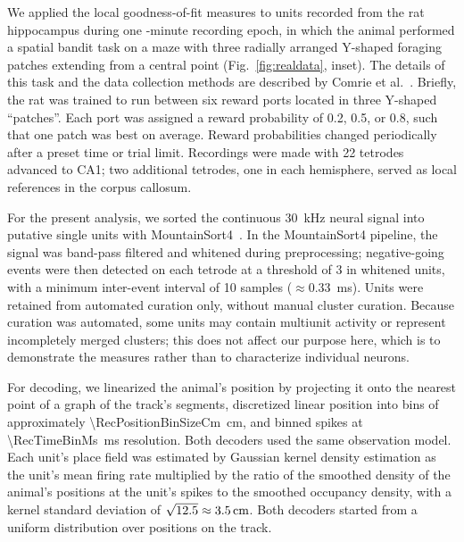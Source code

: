 \documentclass[12pt]{article}
\begin{document}
We applied the local goodness-of-fit measures to units recorded from the rat hippocampus during one \RecEpochDurationMin-minute recording epoch, in which the animal performed a spatial bandit task on a maze with three radially arranged Y-shaped foraging patches extending from a central point (Fig.~\ref{fig:realdata}, inset). The details of this task and the data collection methods are described by Comrie et al.~\cite{ComrieHippocampalrepresentationsalternative2026}. Briefly, the rat was trained to run between six reward ports located in three Y-shaped ``patches''. Each port was assigned a reward probability of 0.2, 0.5, or 0.8, such that one patch was best on average. Reward probabilities changed periodically after a preset time or trial limit. Recordings were made with 22 tetrodes advanced to CA1; two additional tetrodes, one in each hemisphere, served as local references in the corpus callosum.

For the present analysis, we sorted the continuous \SI{30}{kHz} neural signal into putative single units with MountainSort4~\cite{ChungFullyAutomatedApproach2017}. In the MountainSort4 pipeline, the signal was band-pass filtered and whitened during preprocessing; negative-going events were then detected on each tetrode at a threshold of 3 in whitened units, with a minimum inter-event interval of 10 samples ($\approx$\SI{0.33}{ms}). Units were retained from automated curation only, without manual cluster curation. Because curation was automated, some units may contain multiunit activity or represent incompletely merged clusters; this does not affect our purpose here, which is to demonstrate the measures rather than to characterize individual neurons.

For decoding, we linearized the animal's position by projecting it onto the nearest point of a graph of the track's segments, discretized linear position into bins of approximately \SI{\RecPositionBinSizeCm}{cm}, and binned spikes at \SI{\RecTimeBinMs}{ms} resolution. Both decoders used the same observation model. Each unit's place field was estimated by Gaussian kernel density estimation as the unit's mean firing rate multiplied by the ratio of the smoothed density of the animal's positions at the unit's spikes to the smoothed occupancy density, with a kernel standard deviation of $\sqrt{12.5}\approx\SI{3.5}{cm}$. Both decoders started from a uniform distribution over positions on the track.
\end{document}
